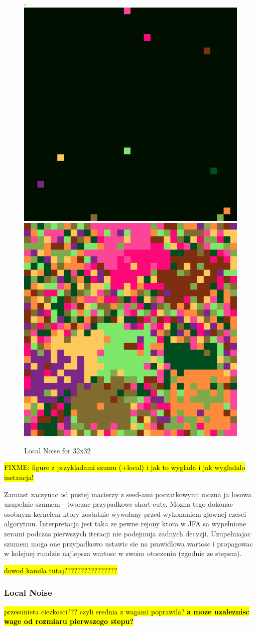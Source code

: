 \documentclass[format=acmsmall,screen,review,authordraft,nonacm]{acmart}
\begin{document}
\begin{figure}[H]
\begin{minipage}{0.48\textwidth}
		,
		\includegraphics[width=0.23\linewidth]{../figures/mod_lnoise_v2_2_in}
		\includegraphics[width=0.23\linewidth]{../figures/mod_lnoise_v2_2_out}
		\caption{Local Noise for 32x32}
		\label{Fig:lnoise}
	\end{minipage}
\end{figure}

\hl{FIXME: figure z przykladami szumu (+local) i jak to wyglada i jak wygladalo
instancja!}

Zamiast zaczynac od pustej macierzy z seed-ami poczatkowymi mozna ja losowa
uzupelnic szumem - tworzac przypadkowe short-cuty. Mozna tego dokonac osobnym
kernelem ktory zostatnie wywolany przed wykonaniem glownej czesci algorytmu.
Interpretacja jest taka ze pewne rejony ktora w JFA sa wypelnione zerami podczas
pierwszych iteracji nie podejmuja zadnych decyzji. Uzupelniajac szumem moga one
przypadkowo ustawic sie na prawidlowa wartosc i propagowac w kolejnej rundzie
najlepsza wartosc w swoim otoczeniu (zgodnie ze stepem).

\hl{dowod kamila tutaj????????????????}

\subsubsection{Local Noise} %

\hl{przesunieta ciezkosci??? czyli srednia z wagami poprawila? \textbf{a moze uzaleznisc
wage od rozmiaru pierwszego stepu?}}

\end{document}
